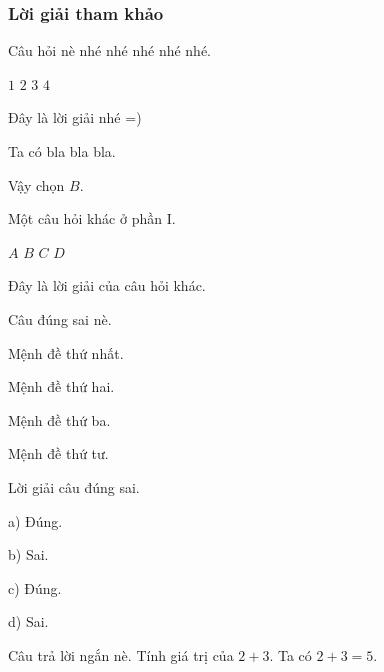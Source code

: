 \documentclass[14pt,a4paper]{extarticle}
\begin{document}
\subsubsection{Lời giải tham khảo}

\newpage




\pagebaitaptonghop



\caugiai
{
Câu hỏi nè nhé nhé nhé nhé nhé.

\bonpa
{\(1\)}
{\(2\)}
{\(3\)}
{\(4\)}
}
{
Đây là lời giải nhé =)

Ta có bla bla bla.

Vậy chọn \(B\).
}

\caugiai
{
Một câu hỏi khác ở phần I.

\bonpa
{\(A\)}
{\(B\)}
{\(C\)}
{\(D\)}
}
{
Đây là lời giải của câu hỏi khác.
}

\setcounter{cau}{0}

\caugiai
{
Câu đúng sai nè.

\begin{dungsai}
\item Mệnh đề thứ nhất.
\item Mệnh đề thứ hai.
\item Mệnh đề thứ ba.
\item Mệnh đề thứ tư.
\end{dungsai}
}
{
Lời giải câu đúng sai.

a) Đúng.

b) Sai.

c) Đúng.

d) Sai.
}

\setcounter{cau}{0}

\caugiai
{
Câu trả lời ngắn nè. Tính giá trị của \(2+3\).
}
{
Ta có \(2+3=5\).
}

\setcounter{cau}{0}

\XoaNganHang %

\ketthucde



\XoaNganHang %

\ketthucde
\end{document}
